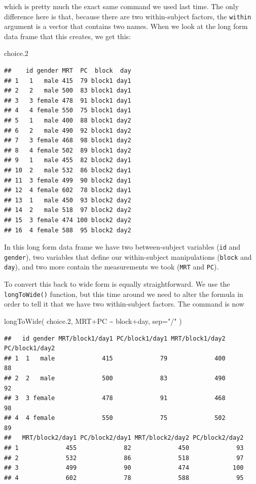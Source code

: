 \documentclass[
]{book}
\newenvironment{Shaded}{\begin{snugshade}}{\end{snugshade}}
\newcommand{\AttributeTok}[1]{\textcolor[rgb]{0.77,0.63,0.00}{#1}}
\newcommand{\FloatTok}[1]{\textcolor[rgb]{0.00,0.00,0.81}{#1}}
\newcommand{\FunctionTok}[1]{\textcolor[rgb]{0.00,0.00,0.00}{#1}}
\newcommand{\NormalTok}[1]{#1}
\newcommand{\SpecialCharTok}[1]{\textcolor[rgb]{0.00,0.00,0.00}{#1}}
\newcommand{\StringTok}[1]{\textcolor[rgb]{0.31,0.60,0.02}{#1}}
\begin{document}
which is pretty much the exact same command we used last time. The only difference here is that, because there are two within-subject factors, the \texttt{within} argument is a vector that contains two names. When we look at the long form data frame that this creates, we get this:

\begin{Shaded}
\begin{Highlighting}[]
\NormalTok{choice}\FloatTok{.2}
\end{Highlighting}
\end{Shaded}

\begin{verbatim}
##    id gender MRT  PC  block  day
## 1   1   male 415  79 block1 day1
## 2   2   male 500  83 block1 day1
## 3   3 female 478  91 block1 day1
## 4   4 female 550  75 block1 day1
## 5   1   male 400  88 block1 day2
## 6   2   male 490  92 block1 day2
## 7   3 female 468  98 block1 day2
## 8   4 female 502  89 block1 day2
## 9   1   male 455  82 block2 day1
## 10  2   male 532  86 block2 day1
## 11  3 female 499  90 block2 day1
## 12  4 female 602  78 block2 day1
## 13  1   male 450  93 block2 day2
## 14  2   male 518  97 block2 day2
## 15  3 female 474 100 block2 day2
## 16  4 female 588  95 block2 day2
\end{verbatim}

In this long form data frame we have two between-subject variables (\texttt{id} and \texttt{gender}), two variables that define our within-subject manipulations (\texttt{block} and \texttt{day}), and two more contain the measurements we took (\texttt{MRT} and \texttt{PC}).

To convert this back to wide form is equally straightforward. We use the \texttt{longToWide()} function, but this time around we need to alter the formula in order to tell it that we have two within-subject factors. The command is now

\begin{Shaded}
\begin{Highlighting}[]
\FunctionTok{longToWide}\NormalTok{( choice}\FloatTok{.2}\NormalTok{, MRT}\SpecialCharTok{+}\NormalTok{PC }\SpecialCharTok{\textasciitilde{}}\NormalTok{ block}\SpecialCharTok{+}\NormalTok{day, }\AttributeTok{sep=}\StringTok{"/"}\NormalTok{ ) }
\end{Highlighting}
\end{Shaded}

\begin{verbatim}
##   id gender MRT/block1/day1 PC/block1/day1 MRT/block1/day2 PC/block1/day2
## 1  1   male             415             79             400             88
## 2  2   male             500             83             490             92
## 3  3 female             478             91             468             98
## 4  4 female             550             75             502             89
##   MRT/block2/day1 PC/block2/day1 MRT/block2/day2 PC/block2/day2
## 1             455             82             450             93
## 2             532             86             518             97
## 3             499             90             474            100
## 4             602             78             588             95
\end{verbatim}
\end{document}
